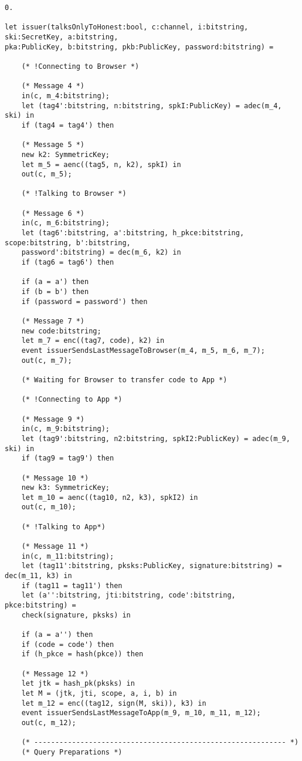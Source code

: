 \begin{Verbatim}[fontsize=\small]
    0.

let issuer(talksOnlyToHonest:bool, c:channel, i:bitstring, ski:SecretKey, a:bitstring,
pka:PublicKey, b:bitstring, pkb:PublicKey, password:bitstring) =

    (* !Connecting to Browser *)

    (* Message 4 *)
    in(c, m_4:bitstring);
    let (tag4':bitstring, n:bitstring, spkI:PublicKey) = adec(m_4, ski) in
    if (tag4 = tag4') then

    (* Message 5 *)
    new k2: SymmetricKey;
    let m_5 = aenc((tag5, n, k2), spkI) in
    out(c, m_5);

    (* !Talking to Browser *)

    (* Message 6 *)
    in(c, m_6:bitstring);
    let (tag6':bitstring, a':bitstring, h_pkce:bitstring, scope:bitstring, b':bitstring,
    password':bitstring) = dec(m_6, k2) in
    if (tag6 = tag6') then

    if (a = a') then
    if (b = b') then
    if (password = password') then

    (* Message 7 *)
    new code:bitstring;
    let m_7 = enc((tag7, code), k2) in
    event issuerSendsLastMessageToBrowser(m_4, m_5, m_6, m_7);
    out(c, m_7);

    (* Waiting for Browser to transfer code to App *)

    (* !Connecting to App *)
     
    (* Message 9 *)
    in(c, m_9:bitstring);
    let (tag9':bitstring, n2:bitstring, spkI2:PublicKey) = adec(m_9, ski) in
    if (tag9 = tag9') then

    (* Message 10 *)
    new k3: SymmetricKey;
    let m_10 = aenc((tag10, n2, k3), spkI2) in
    out(c, m_10);

    (* !Talking to App*)

    (* Message 11 *)
    in(c, m_11:bitstring);
    let (tag11':bitstring, pksks:PublicKey, signature:bitstring) = dec(m_11, k3) in
    if (tag11 = tag11') then
    let (a'':bitstring, jti:bitstring, code':bitstring, pkce:bitstring) = 
    check(signature, pksks) in

    if (a = a'') then
    if (code = code') then
    if (h_pkce = hash(pkce)) then

    (* Message 12 *)
    let jtk = hash_pk(pksks) in
    let M = (jtk, jti, scope, a, i, b) in
    let m_12 = enc((tag12, sign(M, ski)), k3) in
    event issuerSendsLastMessageToApp(m_9, m_10, m_11, m_12);
    out(c, m_12);

    (* ------------------------------------------------------------ *)
    (* Query Preparations *)


\end{Verbatim}
